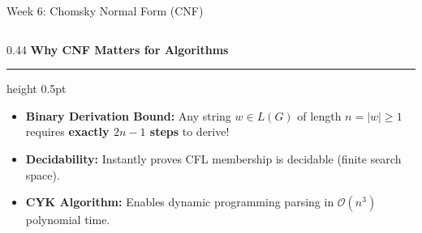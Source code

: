 \documentclass[aspectratio=169, 10pt]{beamer}
\newcommand{\colheader}[1]{%
  {\noindent\footnotesize\bfseries\color{gimpanavy}#1}%
  \vspace{0.03cm}%
  {\color{gimpanavy!30}\hrule height 0.5pt}%
  \vspace{0.08cm}%
}
\begin{document}
\begin{frame}{Week 6: Chomsky Normal Form (CNF)}
\begin{columns}[T]
    \begin{column}{0.44\textwidth}
      \colheader{Why CNF Matters for Algorithms}
      \begin{tcolorbox}[spotlightcard, top=3pt, bottom=3pt]
        \begin{itemize}\setlength{\itemsep}{2.5pt}\footnotesize
          \item \textbf{Binary Derivation Bound:} Any string $w \in L(G)$ of length $n = |w| \ge 1$ requires \textbf{exactly $2n - 1$ steps} to derive!
          \item \textbf{Decidability:} Instantly proves CFL membership is decidable (finite search space).
          \item \textbf{CYK Algorithm:} Enables dynamic programming parsing in $\mathcal{O}(n^3)$ polynomial time.
        \end{itemize}
      \end{tcolorbox}
    \end{column}
  \end{columns}
\end{frame}
\end{document}
